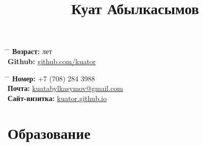 \documentclass[10pt]{article} %
\begin{document}

\title{Куат Абылкасымов} %


\parbox{0.5\textwidth}{ %
\begin{tabbing} %
\hspace{3cm} \= \hspace{4cm} \= \kill %
{\bf Возраст: }  лет \\ %
{\bf Github:} \> \href{https://www.github.com/kuator}{github.com/kuator} \\ %
\end{tabbing}}
\hfill %
\parbox{0.5\textwidth}{ %
\begin{tabbing} %
\hspace{3cm} \= \hspace{4cm} \= \kill %
{\bf Номер: } \> +7 (708) 284 3988 \\ %
{\bf Почта: } \> \href{mailto:kuatabylkasymov@gmail.com}{kuatabylkasymov@gmail.com} \\ %
{\bf Сайт-визитка: } \> \href{https://kuator.github.io}{kuator.github.io} \\ %
\end{tabbing}}


\section{Образование}


\end{document}
